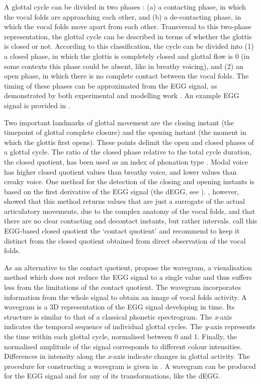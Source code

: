 \documentclass[
  11pt,
  a4paper,
]{article}
\begin{document}
A glottal cycle can be divided in two phases
\citep{childers1985, hampala2016}: (a) a contacting phase, in which the
vocal folds are approaching each other, and (b) a de-contacting phase,
in which the vocal folds move apart from each other. Transversal to this
two-phase representation, the glottal cycle can be described in terms of
whether the glottis is closed or not. According to this classification,
the cycle can be divided into (1) a closed phase, in which the glottis
is completely closed and glottal flow is 0 (in some contexts this phase
could be absent, like in breathy voicing), and (2) an open phase, in
which there is no complete contact between the vocal folds. The timing
of these phases can be approximated from the EGG signal, as demonstrated
by both experimental and modelling work \citep{hampala2016}. An example
EGG signal is provided in .

Two important landmarks of glottal movement are the closing instant (the
timepoint of glottal complete closure) and the opening instant (the
moment in which the glottis first opens). These points delimit the open
and closed phases of a glottal cycle. The ratio of the closed phase
relative to the total cycle duration, the closed quotient, has been used
as an index of phonation type \citep{scherer1987}. Modal voice has
higher closed quotient values than breathy voice, and lower values than
creaky voice. One method for the detection of the closing and opening
instants is based on the first derivative of the EGG signal (the dEGG,
see ). \citet{herbst2017}, however, showed that this method
returns values that are just a surrogate of the actual articulatory
movements, due to the complex anatomy of the vocal folds, and that there
are no clear contacting and decontact instants, but rather intervals.
\citet{herbst2017} call this EGG-based closed quotient the `contact
quotient' and recommend to keep it distinct from the closed quotient
obtained from direct observation of the vocal folds.

As an alternative to the contact quotient, \citet{herbst2010} propose
the wavegram, a visualisation method which does not reduce the EGG
signal to a single value and thus suffers less from the limitations of
the contact quotient. The wavegram incorporates information from the
whole signal to obtain an image of vocal folds activity. A wavegram is a
3D representation of the EGG signal developing in time. Its structure is
similar to that of a classical phonetic spectrogram. The \emph{x}-axis
indicates the temporal sequence of individual glottal cycles. The
\emph{y}-axis represents the time within each glottal cycle, normalised
between 0 and 1. Finally, the normalised amplitude of the signal
corresponds to different colour intensities. Differences in intensity
along the \emph{x}-axis indicate changes in glottal activity. The
procedure for constructing a wavegram is given in . A
wavegram can be produced for the EGG signal and for any of its
transformations, like the dEGG.
\end{document}
